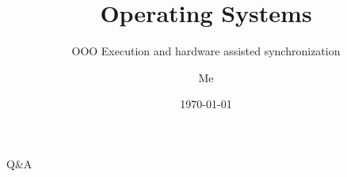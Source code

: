 \documentclass[12pt]{beamer}
\title{Operating Systems}
\subtitle{OOO Execution and hardware assisted synchronization}
\author{Me}
\date{\today}
\begin{document}
  \begin{frame}
    \titlepage
  \end{frame}

  
  
  
  

  \begin{frame}
  \begin{center}
  \Huge Q\&A
  \end{center}
  \end{frame}
\end{document}
